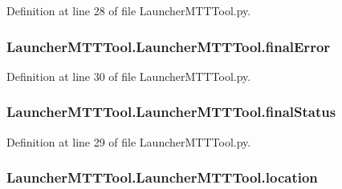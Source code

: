 Definition at line 28 of file Launcher\-M\-T\-T\-Tool.\-py.

\hypertarget{class_launcher_m_t_t_tool_1_1_launcher_m_t_t_tool_a607ea8851059a23f64f5b1ef4590109e}{
\subsubsection[{final\-Error}]{\setlength{\rightskip}{0pt plus 5cm}Launcher\-M\-T\-T\-Tool.\-Launcher\-M\-T\-T\-Tool.\-final\-Error}}\label{class_launcher_m_t_t_tool_1_1_launcher_m_t_t_tool_a607ea8851059a23f64f5b1ef4590109e}


Definition at line 30 of file Launcher\-M\-T\-T\-Tool.\-py.

\hypertarget{class_launcher_m_t_t_tool_1_1_launcher_m_t_t_tool_a24a3038f22807231f60be1efd39f7bcb}{
\subsubsection[{final\-Status}]{\setlength{\rightskip}{0pt plus 5cm}Launcher\-M\-T\-T\-Tool.\-Launcher\-M\-T\-T\-Tool.\-final\-Status}}\label{class_launcher_m_t_t_tool_1_1_launcher_m_t_t_tool_a24a3038f22807231f60be1efd39f7bcb}


Definition at line 29 of file Launcher\-M\-T\-T\-Tool.\-py.

\hypertarget{class_launcher_m_t_t_tool_1_1_launcher_m_t_t_tool_a13b93dfdaa7c433967c808d9bf54dcf9}{
\subsubsection[{location}]{\setlength{\rightskip}{0pt plus 5cm}Launcher\-M\-T\-T\-Tool.\-Launcher\-M\-T\-T\-Tool.\-location}}\label{class_launcher_m_t_t_tool_1_1_launcher_m_t_t_tool_a13b93dfdaa7c433967c808d9bf54dcf9}



